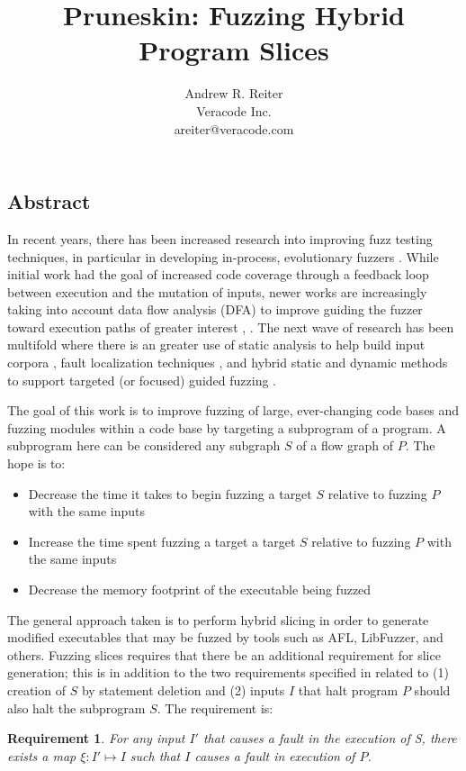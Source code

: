 \documentclass[11pt]{acmart}
\title{\vspace{-4.0cm}Pruneskin: Fuzzing Hybrid Program Slices}
\author{Andrew R. Reiter\\
Veracode Inc.\\
areiter@veracode.com}
\date{}
\newtheorem*{req}{Requirement}
\begin{document}
\maketitle
\begin{multicols}{2}

\section{Abstract}
In recent years, there has been increased research into improving fuzz testing techniques, in particular in
developing in-process, evolutionary fuzzers \cite{DeMott} \cite{AFL} \cite{LibFuzzer}. While
initial work had the goal of increased code coverage through a feedback loop between execution and the mutation
of inputs, newer works are increasingly taking into account data flow analysis (DFA) to improve guiding the fuzzer
toward execution paths of greater interest \cite{Vuzzer}, \cite{Choronzon}. The next wave of research has been multifold
where there is an greater use of static analysis to help build input corpora \cite{StaticPA},  
fault localization techniques \cite{StaticExp}, and hybrid static and dynamic methods to support targeted (or focused)
guided fuzzing \cite{HybridVerimag} \cite{NeedleHeap}.

The goal of this work is to improve fuzzing of large, ever-changing code bases and fuzzing modules within
a code base by targeting a subprogram of a program. A subprogram here can be considered any subgraph $S$ of a flow graph of $P$.
The hope is to:
\begin{itemize}
\item Decrease the time it takes to begin fuzzing a target $S$ relative to fuzzing $P$ with the same inputs
\item Increase the time spent fuzzing a target a target $S$ relative to fuzzing $P$ with the same inputs
\item Decrease the memory footprint of the executable being fuzzed
\end{itemize}

The general approach taken is to perform hybrid slicing  \cite{HybridSlice}
in order to generate modified executables that may be fuzzed by tools such as AFL, LibFuzzer, and others. Fuzzing slices
requires that there be an additional requirement for slice generation; this is in addition to the two requirements specified
in \cite{ProgSlice} related to (1) creation of $S$ by statement deletion and (2) inputs $I$ that halt program $P$ should also halt the subprogram
$S$. The requirement is:
\begin{req}
For any input $I'$ that causes a fault in the execution of S, there exists a map $\xi : I' \mapsto I$ such that $I$ causes a fault in execution of $P$.
\end{req}


\end{multicols}
\end{document}
